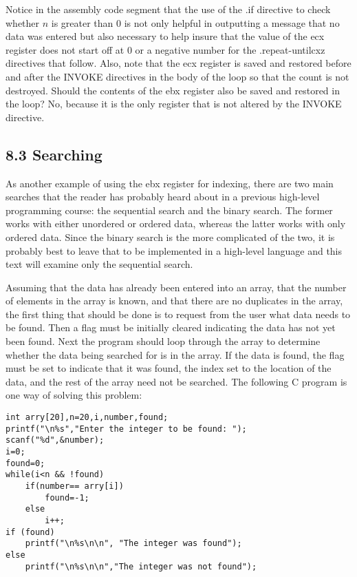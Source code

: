 \documentclass[10pt]{article}
\begin{document}
Notice in the assembly code segment that the use of the .if directive to check whether $n$ is greater than 0 is not only helpful in outputting a message that no data was entered but also necessary to help insure that the value of the ecx register does not start off at 0 or a negative number for the .repeat-untilcxz directives that follow. Also, note that the ecx register is saved and restored before and after the INVOKE directives in the body of the loop so that the count is not destroyed. Should the contents of the ebx register also be saved and restored in the loop? No, because it is the only register that is not altered by the INVOKE directive.

\subsection*{8.3 Searching}
As another example of using the ebx register for indexing, there are two main searches that the reader has probably heard about in a previous high-level programming course: the sequential search and the binary search. The former works with either unordered or ordered data, whereas the latter works with only ordered data. Since the binary search is the more complicated of the two, it is probably best to leave that to be implemented in a high-level language and this text will examine only the sequential search.

Assuming that the data has already been entered into an array, that the number of elements in the array is known, and that there are no duplicates in the array, the first thing that should be done is to request from the user what data needs to be found. Then a flag must be initially cleared indicating the data has not yet been found. Next the program should loop through the array to determine whether the data being searched for is in the array. If the data is found, the flag must be set to indicate that it was found, the index set to the location of the data, and the rest of the array need not be searched. The following C program is one way of solving this problem:

\begin{verbatim}
int arry[20],n=20,i,number,found;
printf("\n%s","Enter the integer to be found: ");
scanf("%d",&number);
i=0;
found=0;
while(i<n && !found)
    if(number== arry[i])
        found=-1;
    else
        i++;
if (found)
    printf("\n%s\n\n", "The integer was found");
else
    printf("\n%s\n\n","The integer was not found");
\end{verbatim}
\end{document}
